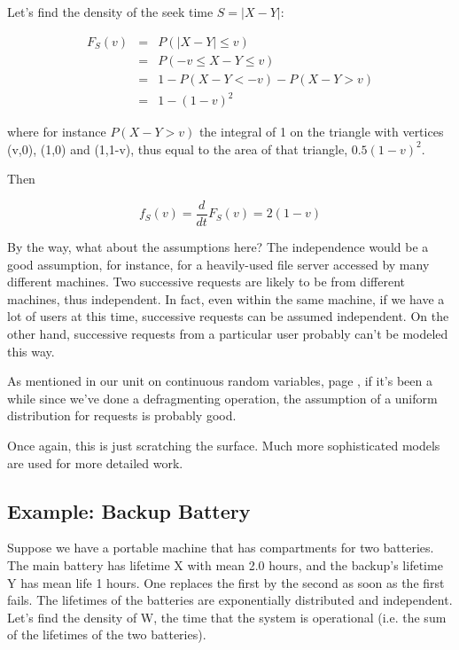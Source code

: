 Let's find the density of the seek time $S = |X-Y|$:

\begin{eqnarray}
F_S(v) &=& P(|X-Y| \leq v) \\
&=& P(-v \leq X-Y \leq v) \\ 
&=& 1 - P(X-Y < -v) - P(X-Y > v) \\
&=& 1 - (1-v)^2
\end{eqnarray}

where for instance $P(X - Y > v)$ the integral of 1 on the triangle with
vertices (v,0), (1,0) and (1,1-v), thus equal to the area of that
triangle, $0.5 (1-v)^2$.

Then

\begin{equation}
f_S(v) = \frac{d}{dt} F_S(v) = 2(1-v)
\end{equation}

By the way, what about the assumptions here?  The independence would be
a good assumption, for instance, for a heavily-used file server accessed
by many different machines.  Two successive requests are likely to be
from different machines, thus independent.  In fact, even within the
same machine, if we have a lot of users at this time, successive
requests can be assumed independent.  On the other hand, successive
requests from a particular user probably can't be modeled this way.

As mentioned in our unit on continuous random variables, page
\pageref{defrag}, if it's been a while since we've done a defragmenting
operation, the assumption of a uniform distribution for requests is
probably good.

Once again, this is just scratching the surface.  Much more
sophisticated models are used for more detailed work.

\subsection{Example:  Backup Battery}
\label{backup}

Suppose we have a portable machine that has compartments for two
batteries. The main battery has lifetime X with mean 2.0 hours, and the
backup's lifetime Y has mean life 1 hours. One replaces the first by
the second as soon as the first fails. The lifetimes of the batteries
are exponentially distributed and independent. Let's find the density of
W, the time that the system is operational (i.e. the sum of the
lifetimes of the two batteries).

